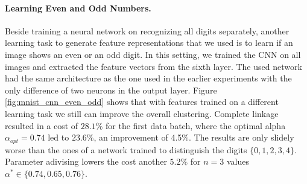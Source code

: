 \paragraph{Learning Even and Odd Numbers.} Beside training a neural network on recognizing all digits separately, another learning task to generate feature representations that we used is to learn if an image shows an even or an odd digit. In this setting, we trained the CNN on all images and extracted the feature vectors from the sixth layer. The used network had the same architecture as the one used in the earlier experiments with the only difference of two neurons in the output layer. Figure \ref{fig:mnist_cnn_even_odd} shows that with features trained on a different learning task we still can improve the overall clustering. Complete linkage resulted in a cost of $28.1\%$ for the first data batch, where the optimal alpha $\alpha_{opt} = 0.74$ led to $23.6\%$, an improvement of 4.5\%. The results are only slidely worse than the ones of a network trained to distinguish the digits $\{0,1,2,3,4\}$. Parameter adivising lowers the cost another $5.2\%$ for $n = 3$ values $\alpha^* \in \{0.74, 0.65, 0.76\}$. 

